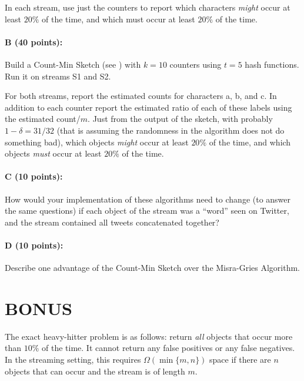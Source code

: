 \documentclass[11pt]{article}
\begin{document}
In each stream, use just the counters to report which characters \emph{might} occur at least $20\%$ of the time, and which must occur at least $20\%$ of the time.  

\paragraph{B (40 points):}  
Build a Count-Min Sketch  (see \textbf{}) with $k=10$ counters using $t=5$ hash functions.  Run it on streams S1 and S2.  

For both streams, report the estimated counts for characters \textsf{a}, \textsf{b}, and \textsf{c}.  In addition to each counter report the estimated ratio of each of these labels using the estimated count/$m$.  
Just from the output of the sketch, with probably $1-\delta = 31/32$ (that is assuming the randomness in the algorithm does not do something bad), 
which objects \emph{might} occur at least $20\%$ of the time, and which objects \emph{must} occur at least $20\%$ of the time.  


\paragraph{C (10 points):}  
How would your implementation of these algorithms need to change (to answer the same questions) if each object of the stream was a ``word'' seen on Twitter, and the stream contained all tweets concatenated together?  

\paragraph{D (10 points):}  
Describe one advantage of the Count-Min Sketch over the Misra-Gries Algorithm.  



\section{BONUS}

The exact heavy-hitter problem is as follows: return \emph{all} objects that occur more than $10\%$ of the time.  It cannot return any false positives or any false negatives.  In the streaming setting, this requires $\Omega(\min\{m,n\})$ space if there are $n$ objects that can occur and the stream is of length $m$.  
\end{document}
